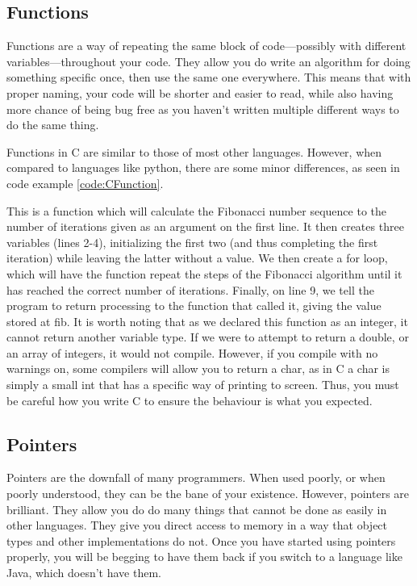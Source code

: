 \documentclass[a4paper,11pt]{report}
\begin{document}
		\subsection{Functions}
			Functions are a way of repeating the same block of code---possibly with different variables---throughout your code. 
			They allow you do write an algorithm for doing something specific once, then use the same one everywhere. 
			This means that with proper naming, your code will be shorter and easier to read, while also having more chance of being bug free as you haven't written multiple different ways to do the same thing. 

			Functions in C are similar to those of most other languages. 
			However, when compared to languages like python, there are some minor differences, as seen in code example \ref{code:CFunction}.
			\begin{code}
				C}]{./CFunction.c}
				\caption{Example of a C Function}
				\label{code:CFunction}
			\end{code}
			This is a function which will calculate the Fibonacci number sequence to the number of iterations given as an argument on the first line. 
			It then creates three variables (lines 2-4), initializing the first two (and thus completing the first iteration) while leaving the latter without a value. 
			We then create a for loop, which will have the function repeat the steps of the Fibonacci algorithm until it has reached the correct number of iterations. 
			Finally, on line 9, we tell the program to return processing to the function that called it, giving the value stored at fib. 
			It is worth noting that as we declared this function as an integer, it cannot return another variable type. 
			If we were to attempt to return a double, or an array of integers, it would not compile. 
			However, if you compile with no warnings on, some compilers will allow you to return a char, as in C a char is simply a small int that has a specific way of printing to screen. 
			Thus, you must be careful how you write C to ensure the behaviour is what you expected. 

		\subsection{Pointers}
			Pointers are the downfall of many programmers. 
			When used poorly, or when poorly understood, they can be the bane of your existence. 
			However, pointers are brilliant. 
			They allow you do do many things that cannot be done as easily in other languages. 
			They give you direct access to memory in a way that object types and other implementations do not. 
			Once you have started using pointers properly, you will be begging to have them back if you switch to a language like Java, which doesn't have them. 
\end{document}
